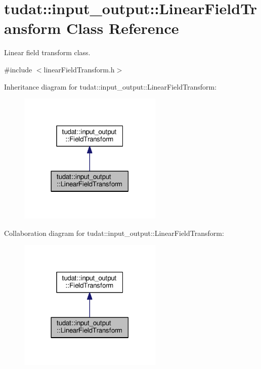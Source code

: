 \hypertarget{classtudat_1_1input__output_1_1LinearFieldTransform}{}\section{tudat\+:\+:input\+\_\+output\+:\+:Linear\+Field\+Transform Class Reference}
\label{classtudat_1_1input__output_1_1LinearFieldTransform}


Linear field transform class.  




{\ttfamily \#include $<$linear\+Field\+Transform.\+h$>$}



Inheritance diagram for tudat\+:\+:input\+\_\+output\+:\+:Linear\+Field\+Transform\+:
\nopagebreak
\begin{figure}[H]
\begin{center}
\leavevmode
\includegraphics[width=194pt]{classtudat_1_1input__output_1_1LinearFieldTransform__inherit__graph}
\end{center}
\end{figure}


Collaboration diagram for tudat\+:\+:input\+\_\+output\+:\+:Linear\+Field\+Transform\+:
\nopagebreak
\begin{figure}[H]
\begin{center}
\leavevmode
\includegraphics[width=194pt]{classtudat_1_1input__output_1_1LinearFieldTransform__coll__graph}
\end{center}
\end{figure}
